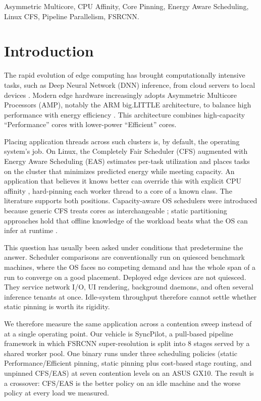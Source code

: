 \documentclass[conference]{IEEEtran}
\begin{document}
\begin{IEEEkeywords}
Asymmetric Multicore, CPU Affinity, Core Pinning, Energy Aware Scheduling, Linux CFS, Pipeline Parallelism, FSRCNN.
\end{IEEEkeywords}

\section{Introduction}
The rapid evolution of edge computing has brought computationally intensive tasks, such as Deep Neural Network (DNN) inference, from cloud servers to local devices \cite{shi2016edge, zhou2019edge}. Modern edge hardware increasingly adopts Asymmetric Multicore Processors (AMP), notably the ARM big.LITTLE architecture, to balance high performance with energy efficiency \cite{greenhalgh2011biglittle, arm2013biglittle}. This architecture combines high-capacity ``Performance'' cores with lower-power ``Efficient'' cores.

Placing application threads across such clusters is, by default, the operating system's job. On Linux, the Completely Fair Scheduler (CFS) augmented with Energy Aware Scheduling (EAS) estimates per-task utilization and places tasks on the cluster that minimizes predicted energy while meeting capacity. An application that believes it knows better can override this with explicit CPU affinity \cite{man7pthreadaffinity}, hard-pinning each worker thread to a core of a known class. The literature supports both positions. Capacity-aware OS schedulers were introduced because generic CFS treats cores as interchangeable \cite{koufaty2010bias, vancraeynest2012pie, saez2010comprehensive}; static partitioning approaches hold that offline knowledge of the workload beats what the OS can infer at runtime \cite{wang2020pipeit, wang2021asymo}.

This question has usually been asked under conditions that predetermine the answer. Scheduler comparisons are conventionally run on quiesced benchmark machines, where the OS faces no competing demand and has the whole span of a run to converge on a good placement. Deployed edge devices are not quiesced. They service network I/O, UI rendering, background daemons, and often several inference tenants at once. Idle-system throughput therefore cannot settle whether static pinning is worth its rigidity.

We therefore measure the same application across a contention sweep instead of at a single operating point. Our vehicle is SyncPilot, a pull-based pipeline framework in which FSRCNN super-resolution \cite{dong2016fsrcnn} is split into 8 stages served by a shared worker pool. One binary runs under three scheduling policies (static Performance/Efficient pinning, static pinning plus cost-based stage routing, and unpinned CFS/EAS) at seven contention levels on an ASUS GX10. The result is a crossover: CFS/EAS is the better policy on an idle machine and the worse policy at every load we measured.
\end{document}
